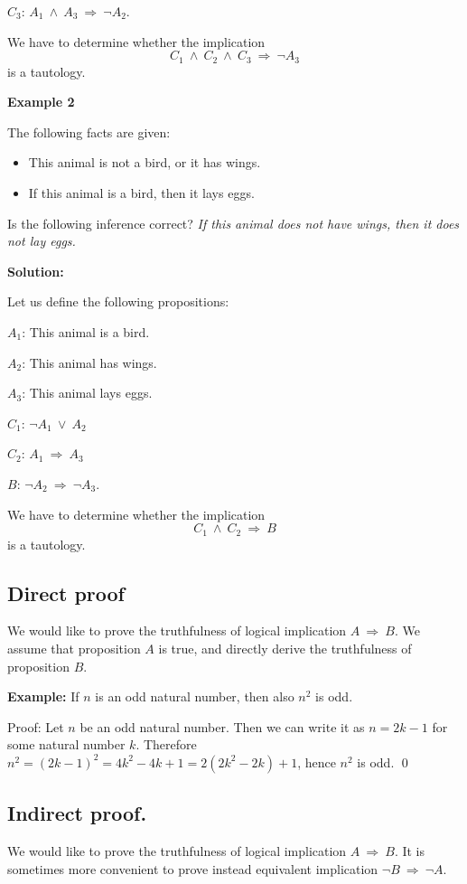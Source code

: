 \documentclass[11pt,paper=b5,footinclude,headinclude]{scrbook} %
\def\ali {{~\vee~}}
\def\inn {{~\wedge~}}
\def\sledi {{~\Rightarrow~}}
\theoremstyle{remark}
\theoremstyle{definition} %
\theoremstyle{theorem} %
\begin{document}
$C_3$: $A_1\inn A_3\sledi \neg A_2$.

We have to determine whether the implication
$$C_1\inn C_2\inn C_3\sledi \neg A_3$$
is a tautology.

\textbf{Example 2}

The following facts are given:
\begin{itemize}
	\item This animal is not a bird, or it has wings.
	\item If this animal is a bird, then it lays eggs.
\end{itemize}
Is the following inference correct?
{\em If this animal does not have wings, then it does not lay eggs.}

\medskip
\textbf{ Solution:}

Let us define the following propositions:

$A_1$: This animal is a bird.

$A_2$: This animal has wings.

$A_3$: This animal lays eggs.

$C_1$: $\neg A_1\ali A_2$

$C_2$: $A_1\sledi A_3$

$B$: $\neg A_2\sledi \neg A_3$.

We have to determine whether the implication
$$C_1\inn C_2\sledi B$$
is a tautology.


\subsection{Direct proof}

We would like to prove the truthfulness of logical implication $A \sledi  B$.
We assume that proposition $A$ is true, and directly derive the truthfulness of proposition $B$.


\medskip
\textbf{ Example:}
If $n$ is an odd natural number, then also $n^2$ is odd.

Proof: Let $n$ be an odd natural number.
Then we can write it as $n = 2k-1$ for some natural number $k$.
Therefore $n^2 = (2k-1)^2 = 4k^2-4k+1 = 2(2k^2-2k)+1$, hence  $n^2$ is odd. \qed

\subsection{Indirect proof.}

We would like to prove the truthfulness of  logical implication $A \sledi  B$. It is sometimes more convenient to
prove instead equivalent implication $\neg B \sledi \neg A$.
\end{document}
